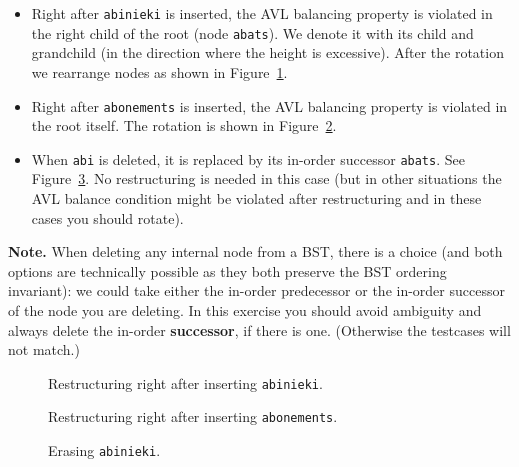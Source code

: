 \documentclass[11pt]{article}
\begin{document}
\begin{itemize}
\item Right after {\tt abinieki} is inserted, the AVL balancing property 
is violated in the right child of the root (node {\tt abats}). We denote 
it with its child and grandchild (in the direction where the height is excessive). 
After the rotation we rearrange nodes as shown in Figure~\ref{fig:avl-trees1}. 
\item Right after {\tt abonements} is inserted, the AVL balancing property is
violated in the root itself. The rotation is shown in Figure~\ref{fig:avl-trees2}. 
\item When {\tt abi} is deleted, it is replaced by its in-order successor {\tt abats}. 
See Figure~\ref{fig:avl-trees3}.
No restructuring is needed in this case (but in other situations the AVL balance 
condition might be violated after restructuring and in these cases you should rotate). 
\end{itemize}

{\bf Note.} When deleting any internal node from a BST, there is a choice 
(and both options are technically possible as they both preserve the BST ordering invariant): 
we could take either the in-order predecessor or the in-order successor of the node you are deleting. 
In this exercise you should avoid ambiguity and always delete the in-order {\bf successor}, if there is one. 
(Otherwise the testcases will not match.)


\begin{figure}[!htb]
\caption{\label{fig:avl-trees1} Restructuring right after inserting {\tt abinieki}.}
\end{figure}

\begin{figure}[!htb]
\caption{\label{fig:avl-trees2} Restructuring right after inserting {\tt abonements}.}
\end{figure}

\begin{figure}[!htb]
\caption{\label{fig:avl-trees3} Erasing {\tt abinieki}.}
\end{figure}
\end{document}
